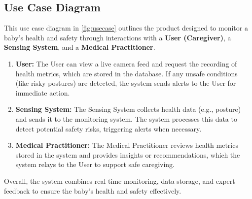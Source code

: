 \documentclass[12pt,a4paper]{report}
\begin{document}
\subsection{Use Case Diagram}

This use case diagram in \ref{fig:usecase} outlines the product designed to monitor a baby’s health and safety through interactions with a \textbf{User (Caregiver)}, a \textbf{Sensing System}, and a \textbf{Medical Practitioner}.

\begin{enumerate}
    \item \textbf{User:} The User can view a live camera feed and request the recording of health metrics, which are stored in the database. If any unsafe conditions (like risky postures) are detected, the system sends alerts to the User for immediate action.
    
    \item \textbf{Sensing System:} The Sensing System collects health data (e.g., posture) and sends it to the monitoring system. The system processes this data to detect potential safety risks, triggering alerts when necessary.
    
    \item \textbf{Medical Practitioner:} The Medical Practitioner reviews health metrics stored in the system and provides insights or recommendations, which the system relays to the User to support safe caregiving.
\end{enumerate}

Overall, the system combines real-time monitoring, data storage, and expert feedback to ensure the baby’s health and safety effectively.
\end{document}
